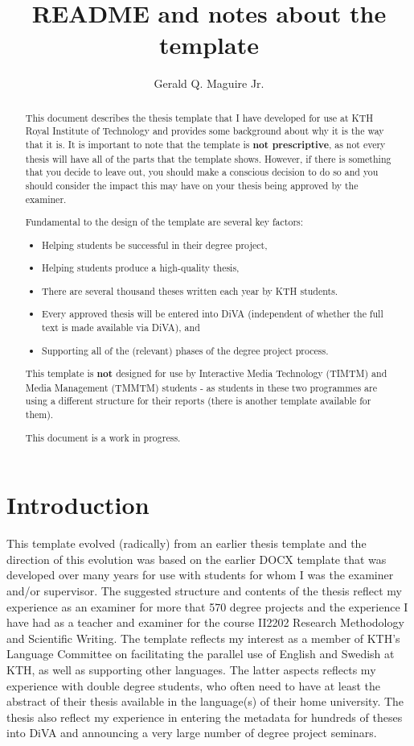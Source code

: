 \documentclass{article}
\title{README and notes about the template}
\author{Gerald Q. Maguire Jr.}
\begin{document}
\maketitle

\begin{abstract}
This document describes the thesis template that I have developed for use at KTH Royal Institute of Technology and provides some background about why it is the way that it is. It is important to note that the template is \textbf{not prescriptive}, as not every thesis will have all of the parts that the template shows. However, if there is something that you decide to leave out, you should make a conscious decision to do so and you should consider the impact this may have on your thesis being approved by the examiner.

Fundamental to the design of the template are several key factors:
\begin{itemize}
    \item Helping students be successful in their degree project,
    \item Helping students produce a \mbox{high-quality} thesis,
    \item There are several thousand theses written each year by KTH students.
    \item Every approved thesis will be entered into DiVA (independent of whether the full text is made available via DiVA), and
    \item Supporting all of the (relevant) phases of the degree project process.
\end{itemize}

This template is \textbf{not} designed for use by Interactive Media Technology (TIMTM) and Media Management (TMMTM) students - as students in these two programmes are using a different structure for their reports (there is another template available for them).

This document is a work in progress.
\end{abstract}

\section{Introduction}
This template evolved (radically) from an earlier thesis template and the direction of this evolution was based on the earlier DOCX template that was developed over many years for use with students for whom I was the examiner and/or supervisor. The suggested structure and contents of the thesis reflect my experience as an examiner for more that 570 degree projects and the experience I have had as a teacher and examiner for the course II2202 Research Methodology and Scientific Writing. The template reflects my interest as a member of KTH's Language Committee on facilitating the parallel use of English and Swedish at KTH, as well as supporting other languages. The latter aspects reflects my experience with double degree students, who often need to have at least the abstract of their thesis available in the language(s) of their home university. The thesis also reflect my experience in entering the metadata for hundreds of theses into DiVA and announcing a very large number of degree project seminars.
\end{document}
